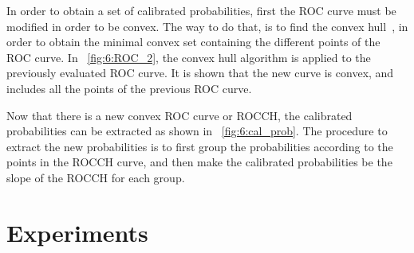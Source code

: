 In order to obtain a set of calibrated probabilities, first the ROC curve must be modified in 
order to be convex. The way to do that, is to find the convex \mbox{hull 
\citep{Hernandez-Orallo2012}}, in order to obtain the minimal convex set containing the different 
points of the ROC curve. In \figurename{~\ref{fig:6:ROC_2}}, the convex hull algorithm is applied 
to the previously evaluated ROC curve. It is shown that the new curve is convex, and includes all 
the points of the previous ROC curve.

Now that there is a new convex ROC curve or ROCCH, the calibrated probabilities can be extracted 
as shown in  \figurename{~\ref{fig:6:cal_prob}}. The procedure to extract the new probabilities is 
to first group the probabilities according to the points in the ROCCH curve, and then make the 
calibrated  probabilities be the slope of the ROCCH for each group.
  
   
\section{Experiments}
\label{sec:6:experiments}
